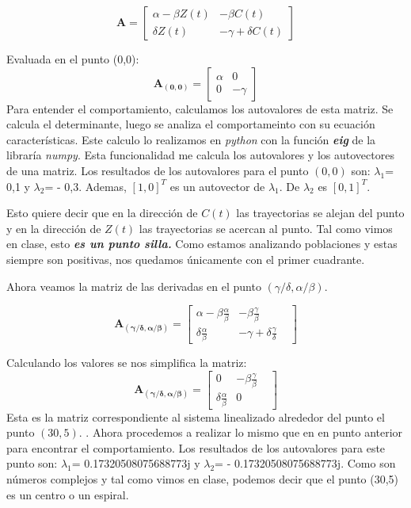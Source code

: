 \documentclass{article}
\begin{document}
\[
\mathbf{A} =
\begin{bmatrix}
  \alpha - \beta Z(t) & 
  - \beta C(t)  \\[1ex] %
    \delta  Z(t) & 
  - \gamma + \delta C(t)  
\end{bmatrix}
\]

Evaluada en el punto (0,0):
\[
\mathbf{A_{(0,0)}} =
\begin{bmatrix}
  \alpha & 
  0  \\[1ex] %
    0 & 
  - \gamma  
\end{bmatrix}
\]
Para entender el comportamiento, calculamos los autovalores de esta matriz. Se calcula el determinante, luego se analiza el comportameinto con su ecuación características. Este calculo lo realizamos en \textit{python} con la función \textbf{\textit{eig}} de la libraría \textit{numpy}. Esta funcionalidad me calcula los autovalores y los autovectores de una matriz.
Los resultados de los autovalores para el punto $(0,0)$ son: $\lambda_{1}$= 0,1 y $\lambda_{2}$= - 0,3. Ademas, $[1,0]^T$ es un autovector de $\lambda_{1}$. De $\lambda_{2}$ es $[0,1]^T$.

Esto quiere decir que en la dirección de $C(t)$ las trayectorias se alejan del punto y en la dirección de $Z(t)$ las trayectorias se acercan al punto. Tal como vimos en clase, esto \textbf{\textit{es un punto silla. }}Como estamos analizando poblaciones y estas siempre son positivas, nos quedamos únicamente con el primer cuadrante.

Ahora veamos la matriz de las derivadas en el punto $(\gamma/\delta, \alpha/\beta)$.

\[
\mathbf{A_{(\gamma/\delta, \alpha/\beta)}} =
\begin{bmatrix}
   \alpha - \beta \frac{\alpha}{\beta} & 
    - \beta \frac{\gamma}{\beta} & \\[1ex] %
     \delta \frac{\alpha}{\beta} & 
     - \gamma +\delta \frac{\gamma}{\delta}
\end{bmatrix}
\]

Calculando los valores se nos  simplifica la matriz:
\[
\mathbf{A_{(\gamma/\delta, \alpha/\beta)}} =
\begin{bmatrix}
   0 & 
    - \beta \frac{\gamma}{\beta} & \\[1ex] %
     \delta \frac{\alpha}{\beta} & 
    0
\end{bmatrix}
\]
Esta es la matriz correspondiente al sistema linealizado alrededor del punto el punto $(30,5)$. . Ahora procedemos a realizar lo mismo que en en punto anterior para encontrar el comportamiento.
Los resultados de los autovalores para este punto son: $\lambda_{1}$=  0.17320508075688773j y $\lambda_{2}$= - 0.17320508075688773j. Como son números complejos y tal como vimos en clase, podemos decir que el punto (30,5) es un centro o un espiral.
\end{document}
